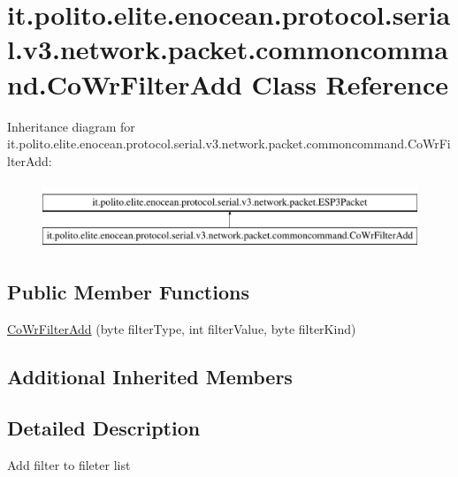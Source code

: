 \hypertarget{classit_1_1polito_1_1elite_1_1enocean_1_1protocol_1_1serial_1_1v3_1_1network_1_1packet_1_1commoncommand_1_1_co_wr_filter_add}{}\section{it.\+polito.\+elite.\+enocean.\+protocol.\+serial.\+v3.\+network.\+packet.\+commoncommand.\+Co\+Wr\+Filter\+Add Class Reference}
\label{classit_1_1polito_1_1elite_1_1enocean_1_1protocol_1_1serial_1_1v3_1_1network_1_1packet_1_1commoncommand_1_1_co_wr_filter_add}
Inheritance diagram for it.\+polito.\+elite.\+enocean.\+protocol.\+serial.\+v3.\+network.\+packet.\+commoncommand.\+Co\+Wr\+Filter\+Add\+:\begin{figure}[H]
\begin{center}
\leavevmode
\includegraphics[height=2.000000cm]{classit_1_1polito_1_1elite_1_1enocean_1_1protocol_1_1serial_1_1v3_1_1network_1_1packet_1_1commoncommand_1_1_co_wr_filter_add}
\end{center}
\end{figure}
\subsection*{Public Member Functions}
\begin{DoxyCompactItemize}
\item 
\hyperlink{classit_1_1polito_1_1elite_1_1enocean_1_1protocol_1_1serial_1_1v3_1_1network_1_1packet_1_1commoncommand_1_1_co_wr_filter_add_aef2156439f26a36839768105ada669a8}{Co\+Wr\+Filter\+Add} (byte filter\+Type, int filter\+Value, byte filter\+Kind)
\end{DoxyCompactItemize}
\subsection*{Additional Inherited Members}


\subsection{Detailed Description}
Add filter to fileter list

